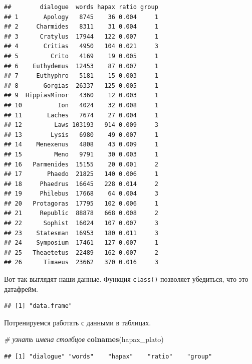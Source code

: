 \documentclass[
]{book}
\newenvironment{Shaded}{\begin{snugshade}}{\end{snugshade}}
\newcommand{\CommentTok}[1]{\textcolor[rgb]{0.56,0.35,0.01}{\textit{#1}}}
\newcommand{\FunctionTok}[1]{\textcolor[rgb]{0.13,0.29,0.53}{\textbf{#1}}}
\newcommand{\NormalTok}[1]{#1}
\newcommand{\SpecialCharTok}[1]{\textcolor[rgb]{0.81,0.36,0.00}{\textbf{#1}}}
\newcommand{\StringTok}[1]{\textcolor[rgb]{0.31,0.60,0.02}{#1}}
\theoremstyle{definition}
\theoremstyle{definition}
\theoremstyle{definition}
\theoremstyle{definition}
\theoremstyle{remark}
\begin{document}
\begin{verbatim}
##        dialogue  words hapax ratio group
## 1       Apology   8745    36 0.004     1
## 2     Charmides   8311    31 0.004     1
## 3      Cratylus  17944   122 0.007     1
## 4       Critias   4950   104 0.021     3
## 5         Crito   4169    19 0.005     1
## 6    Euthydemus  12453    87 0.007     1
## 7     Euthyphro   5181    15 0.003     1
## 8       Gorgias  26337   125 0.005     1
## 9  HippiasMinor   4360    12 0.003     1
## 10          Ion   4024    32 0.008     1
## 11       Laches   7674    27 0.004     1
## 12         Laws 103193   914 0.009     3
## 13        Lysis   6980    49 0.007     1
## 14    Menexenus   4808    43 0.009     1
## 15         Meno   9791    30 0.003     1
## 16   Parmenides  15155    20 0.001     2
## 17       Phaedo  21825   140 0.006     1
## 18     Phaedrus  16645   228 0.014     2
## 19     Philebus  17668    64 0.004     3
## 20   Protagoras  17795   102 0.006     1
## 21     Republic  88878   668 0.008     2
## 22      Sophist  16024   107 0.007     3
## 23    Statesman  16953   180 0.011     3
## 24    Symposium  17461   127 0.007     1
## 25   Theaetetus  22489   162 0.007     2
## 26      Timaeus  23662   370 0.016     3
\end{verbatim}

Вот так выглядят наши данные. Функция \texttt{class()} позволяет убедиться, что это датафрейм.

\begin{verbatim}
## [1] "data.frame"
\end{verbatim}

Потренируемся работать с данными в таблицах.

\begin{Shaded}
\begin{Highlighting}[]
\CommentTok{\# узнать имена столбцов}
\FunctionTok{colnames}\NormalTok{(hapax\_plato) }
\end{Highlighting}
\end{Shaded}

\begin{verbatim}
## [1] "dialogue" "words"    "hapax"    "ratio"    "group"
\end{verbatim}

\begin{Shaded}
\end{Shaded}
\end{document}
